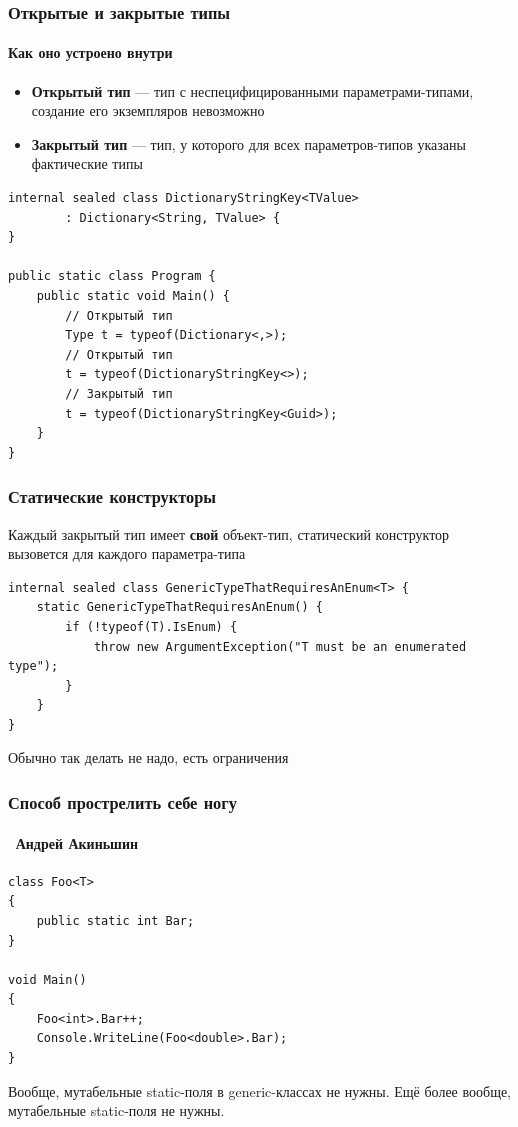 \documentclass[xetex,mathserif,serif]{beamer}
\begin{document}
	\begin{frame}[fragile]
		\frametitle{Открытые и закрытые типы}
		\framesubtitle{Как оно устроено внутри}
		\begin{itemize}
			\item \textbf{Открытый тип} --- тип с неспецифицированными параметрами-типами, создание его экземпляров невозможно
			\item \textbf{Закрытый тип} --- тип, у которого для всех параметров-типов указаны фактические типы
		\end{itemize}
		\begin{scriptsize}
			\begin{verbatim}
internal sealed class DictionaryStringKey<TValue> 
        : Dictionary<String, TValue> {
}

public static class Program {
    public static void Main() {
        // Открытый тип
        Type t = typeof(Dictionary<,>);
        // Открытый тип
        t = typeof(DictionaryStringKey<>);
        // Закрытый тип
        t = typeof(DictionaryStringKey<Guid>);
    }
}
			\end{verbatim}
		\end{scriptsize}
	\end{frame}

	\begin{frame}[fragile]
		\frametitle{Статические конструкторы}
		Каждый закрытый тип имеет \textbf{свой} объект-тип, статический конструктор вызовется для каждого параметра-типа
		\vspace{0.8cm}
		\begin{footnotesize}
			\begin{verbatim}
internal sealed class GenericTypeThatRequiresAnEnum<T> {
    static GenericTypeThatRequiresAnEnum() {
        if (!typeof(T).IsEnum) {
            throw new ArgumentException("T must be an enumerated type");
        }
    }
}
			\end{verbatim}
		\end{footnotesize}
		\vspace{0.8cm}
		Обычно так делать не надо, есть ограничения
	\end{frame}

	\begin{frame}[fragile]
		\frametitle{Способ прострелить себе ногу}
		\framesubtitle{\textcopyright\, Андрей Акиньшин}
		\begin{small}
			\begin{verbatim}
class Foo<T>
{
    public static int Bar;
}

void Main()
{
    Foo<int>.Bar++;
    Console.WriteLine(Foo<double>.Bar);
}
			\end{verbatim}
		\end{small}
		Вообще, мутабельные static-поля в generic-классах не нужны. Ещё более вообще, мутабельные static-поля не нужны.
	\end{frame}
\end{document}
